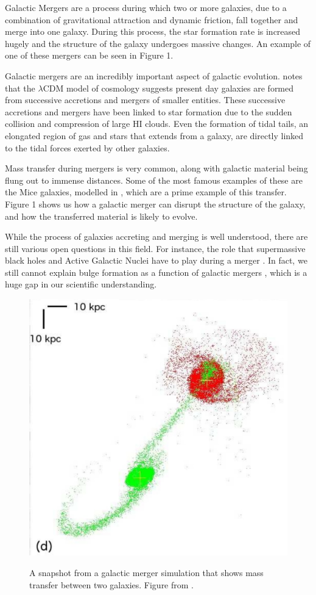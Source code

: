 \documentclass[linenumbers, ]{aastex631}
\begin{document}
Galactic Mergers are a process during which two or more galaxies, due to a combination of gravitational attraction and dynamic friction, fall together and merge into one galaxy. During this process, the star formation rate is increased hugely \citep{Moster_2011} and the structure of the galaxy undergoes massive changes. An example of one of these mergers can be seen in Figure 1.

Galactic mergers are an incredibly important aspect of galactic evolution. \citep{1978MNRAS.183..341W} notes that the $\lambda\text{CDM}$ model of cosmology suggests present day galaxies are formed from successive accretions and mergers of smaller entities. These successive accretions and mergers have been linked to star formation \citep{Barnes_2004} due to the sudden collision and compression of large HI clouds. Even the formation of tidal tails, an elongated region of gas and stars that extends from a galaxy, are directly linked to the tidal forces exerted by other galaxies.

Mass transfer during mergers is very common, along with galactic material being flung out to immense distances. Some of the most famous examples of these are the Mice galaxies, modelled in \citep{Privon_2013}, which are a prime example of this transfer. Figure 1 shows us how a galactic merger can disrupt the structure of the galaxy, and how the transferred material is likely to evolve. 

While the process of galaxies accreting and merging is well understood, there are still various open questions in this field. For instance, the role that supermassive black holes and Active Galactic Nuclei have to play during a merger \citep{Silverman_2011}. In fact, we still cannot explain bulge formation as a function of galactic mergers \citep{Brooks2016}, which is a huge gap in our scientific understanding.

\begin{figure}
    \centering
    \includegraphics[width = 0.5\linewidth]{page08_1.jpg}
    \label{fig:Privonimage}
    \caption{A snapshot from a galactic merger simulation that shows mass transfer between two galaxies. Figure from \citep{Privon_2013}.}
\end{figure}
\end{document}

